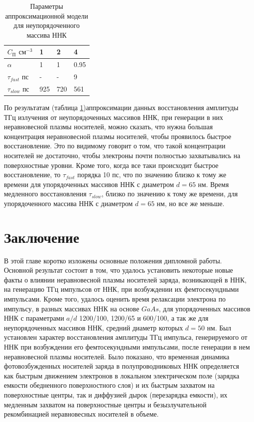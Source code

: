 \documentclass[a4paper,14pt,russian]{extreport}
\begin{document}
\begin{table}
\centering
\caption{Параметры аппроксимационной модели для неупорядоченного массива ННК}
\label{table:CoefitientsDesordered}
\begin{tabular}{@{}llll@{}}
\toprule
$C_\text{П}$ $\text{см}^{-3}$ & 1 & 2  & 4   \\ \midrule
$\alpha$                                               & 1   & 1 & 0.95\\
$\tau_{fast}$ пс                                       & -   & -  & 9  \\
$\tau_{slow}$ пс                                       & 925 & 720 & 561 \\ \bottomrule
\end{tabular}
\end{table}
				По результатам (таблица \ref{table:CoefitientsDesordered})аппроксимации данных восстановления амплитуды ТГц излучения от неупорядоченных массивов ННК, при генерации в них неравновесной плазмы носителей, можно сказать, что нужна большая концентрация неравновесной плазмы носителей, чтобы проявилось быстрое восстановление. Это по видимому говорит о том, что такой концентрации носителей не достаточно, чтобы электроны почти полностью захватывались на поверхностные уровни. Кроме того, когда все таки происходит быстрое восстановление, то $\tau_{fast}$ порядка 10 пс, что по значению близко к тому же времени для упорядоченных массивов ННК с диаметром $d = 65 \text{ нм}$. Время медленного восстановления $\tau_{slow}$, близко по значению к тому же времени, для упорядоченного массива ННК с диаметром $d = 65 \text{ нм}$, но все же меньше.
	\chapter{Заключение}
		В этой главе коротко изложены основные положения дипломной работы. Основной результат состоит в том, что удалось установить некоторые новые факты о влиянии неравновесной плазмы носителей заряда, возникающей в ННК, на генерацию ТГц импульсов от ННК, при возбуждении их фемтосекундными импульсами. Кроме того, удалось оценить время релаксации электрона по импульсу, в разных массивах ННК на основе $GaAs$, для упорядоченных массивов ННК с параметрами $a/d$ 1200/100, 1200/65 и 600/100, а так же для неупорядоченных массивов ННК, средний диаметр которых $d = 50 \text{ нм}$. Был установлен характер восстановления амплитуды ТГц импульса, генерируемого от ННК при возбуждении его фемтосекундными импульсами, после генерации в нем неравновесной плазмы носителей. Было показано, что временная динамика фотовозбужденных носителей заряда в полупроводниковых ННК определяется как быстрым движением электронов в локальном электрическом поле (зарядка емкости обедненного поверхностного слоя) и их быстрым захватом на поверхностные центры, так и диффузией дырок (перезарядка емкости), их медленным захватом на поверхностные центры и безызлучательной рекомбинацией неравновесных носителей в объеме.  
\end{document}

